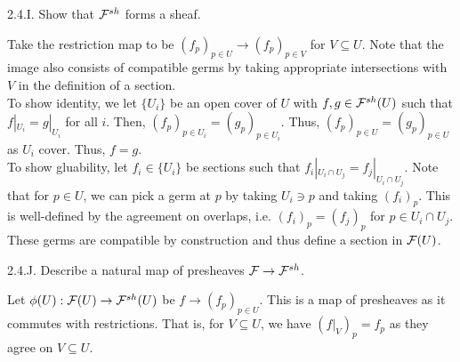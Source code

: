 \begin{exercise}{2.4.I.} 
    Show that $\mathcal{F}^{sh}$ forms a sheaf. 
\end{exercise}
\begin{solution}
    Take the restriction map to be $(f_p)_{p \in U} \to (f_p)_{p \in V}$ for $V \subseteq U$. Note that the image also consists of compatible germs by taking appropriate intersections with $V$ in the definition of a section. \\
    To show identity, we let $\{U_i\}$ be an open cover of $U$ with $f, g \in \mathcal{F}^{sh}(U)$ such that $f|_{U_i} = g|_{U_i}$ for all $i$. Then, $(f_p)_{p \in U_i} = (g_p)_{p \in U_i}$. Thus, $(f_p)_{p \in U} = (g_p)_{p \in U}$ as $U_i$ cover. Thus, $f = g$. \\ 
    To show gluability, let $f_i \in \{U_i\}$ be sections such that $f_i|_{U_{i} \cap U_{j}} = f_j|_{U_{i} \cap U_{j}}$. Note that for $p \in U$, we can pick a germ at $p$ by taking $U_i \ni p$ and taking $(f_i)_p$. This is well-defined by the agreement on overlaps, i.e. $(f_i)_{p} = (f_j)_p$ for $p \in U_i \cap U_j$. These germs are compatible by construction and thus define a section in $\mathcal{F}(U)$.
\end{solution}

\begin{exercise}{2.4.J.} 
    Describe a natural map of presheaves $\mathcal{F} \to \mathcal{F}^{sh}$. 
\end{exercise}
\begin{solution}
    Let $\phi(U): \mathcal{F}(U) \to \mathcal{F}^{sh}(U)$ be $f \to (f_p)_{p \in U}$. This is a map of presheaves as it commutes with restrictions. That is, for $V \subseteq U$, we have $(f|_V)_p = f_p$ as they agree on $V \subseteq U$. 
\end{solution}

